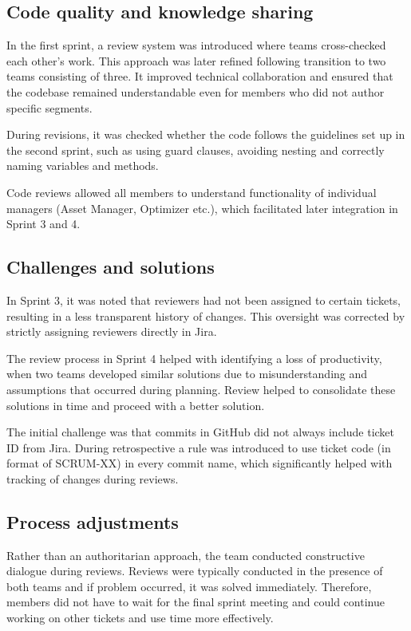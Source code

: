 \subsection{Code quality and knowledge sharing}
In the first sprint, a review system was introduced where teams cross-checked each other’s work. This approach was later refined following transition to two teams consisting of three. It improved technical collaboration and ensured that the codebase remained understandable even for members who did not author specific segments.

During revisions, it was checked whether the code follows the guidelines set up in the second sprint, such as using guard clauses, avoiding nesting and correctly naming variables and methods.

Code reviews allowed all members to understand functionality of individual managers (Asset Manager, Optimizer etc.), which facilitated later integration in Sprint 3 and 4.

\subsection{Challenges and solutions}
In Sprint 3, it was noted that reviewers had not been assigned to certain tickets, resulting in a less transparent history of changes. This oversight was corrected by strictly assigning reviewers directly in Jira.

The review process in Sprint 4 helped with identifying a loss of productivity, when two teams developed similar solutions due to misunderstanding and assumptions that occurred during planning. Review helped to consolidate these solutions in time and proceed with a better solution.

The initial challenge was that commits in GitHub did not always include ticket ID from Jira. During retrospective a rule was introduced to use ticket code (in format of SCRUM-XX) in every commit name, which significantly helped with tracking of changes during reviews.

\subsection{Process adjustments}
Rather than an authoritarian approach, the team conducted constructive dialogue during reviews. Reviews were typically conducted in the presence of both teams and if problem occurred, it was solved immediately. Therefore, members did not have to wait for the final sprint meeting and could continue working on other tickets and use time more effectively.

